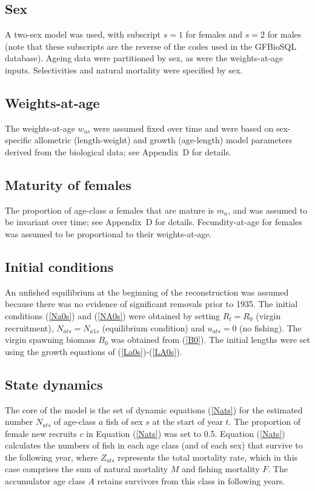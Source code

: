 \documentclass[11pt]{book}
\newcommand{\AppBio}{Appendix~D}
\newcommand{\eref}[1]{(\ref{#1})}
\begin{document}
\subsection{Sex}

A two-sex model was used, with subscript $s{=}1$ for females and $s{=}2$ for males (note that these subscripts are the reverse of the codes used in the GFBioSQL database). 
Ageing data were partitioned by sex, as were the weights-at-age inputs. 
Selectivities and natural mortality were specified by sex.

\subsection{Weights-at-age}

The weights-at-age $w_{as}$ were assumed fixed over time and were based on sex-specific allometric (length-weight) and growth (age-length) model parameters derived from the biological data; see \AppBio{} for details.

\subsection{Maturity of females}

The proportion of age-class $a$ females that are mature is $m_a$, and was assumed to be invariant over time; see \AppBio{} for details.
Fecundity-at-age for females was assumed to be proportional to their weights-at-age.

\subsection{Initial conditions}

An unfished equilibrium at the beginning of the reconstruction was assumed because there was no evidence of significant removals prior to 1935.
The initial conditions \eref{Na0s} and \eref{NA0s} were obtained by setting $R_t = R_0$ (virgin recruitment), $N_{ats} = N_{a1s}$ (equilibrium condition) and $u_{ats} = 0$ (no fishing).
The virgin spawning biomass $B_0$ was obtained from \eref{B0}.
The initial lengths were set using the growth equations of \citet{Schnute:1981} \eref{La0s}-\eref{LA0s}.

\subsection{State dynamics}

The core of the model is the set of dynamic equations \eref{Nats} for the estimated number $N_{ats}$ of age-class $a$ fish of sex $s$ at the start of year $t$. 
The proportion of female new recruits $c$ in Equation \eref{Nats} was set to 0.5.
Equation \eref{Nats} calculates the numbers of fish in each age class (and of each sex) that survive to the following year, where $Z_{ats}$ represents the total mortality rate, which in this case comprises the sum of natural mortality $M$ and fishing mortality $F$. 
The accumulator age class $A$ retains survivors from this class in following years.
\end{document}
